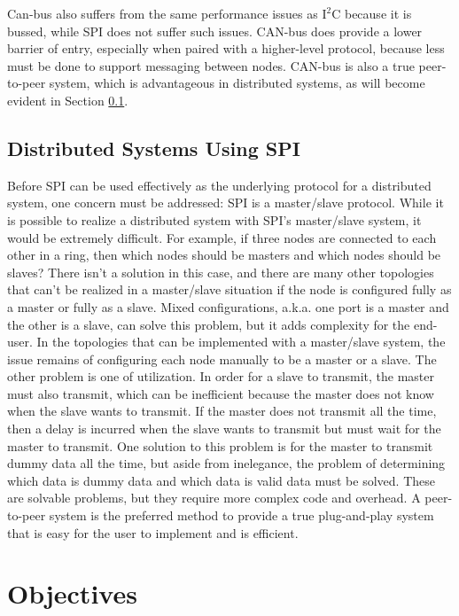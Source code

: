 Can-bus also suffers from the same performance issues as $\textrm{I}^2 \textrm{C}$ because it is bussed, while SPI does not suffer such issues. CAN-bus does provide a lower barrier of entry, especially when paired with a higher-level protocol, because less must be done to support messaging between nodes. CAN-bus is also a true peer-to-peer system, which is advantageous in distributed systems, as will become evident in Section \ref{sec:spi:background:distributed_systems}.

\subsection{Distributed Systems Using SPI} \label{sec:spi:background:distributed_systems}

Before SPI can be used effectively as the underlying protocol for a distributed system, one concern must be addressed: SPI is a master/slave protocol. While it is possible to realize a distributed system with SPI's master/slave system, it would be extremely difficult. For example, if three nodes are connected to each other in a ring, then which nodes should be masters and which nodes should be slaves? There isn't a solution in this case, and there are many other topologies that can't be realized in a master/slave situation if the node is configured fully as a master or fully as a slave. Mixed configurations, a.k.a. one port is a master and the other is a slave, can solve this problem, but it adds complexity for the end-user. In the topologies that can be implemented with a master/slave system, the issue remains of configuring each node manually to be a master or a slave. The other problem is one of utilization. In order for a slave to transmit, the master must also transmit, which can be inefficient because the master does not know when the slave wants to transmit. If the master does not transmit all the time, then a delay is incurred when the slave wants to transmit but must wait for the master to transmit. One solution to this problem is for the master to transmit dummy data all the time, but aside from inelegance, the problem of determining which data is dummy data and which data is valid data must be solved. These are solvable problems, but they require more complex code and overhead. A peer-to-peer system is the preferred method to provide a true plug-and-play system that is easy for the user to implement and is efficient. 

\section{Objectives}\label{sec:spi:objectives}

